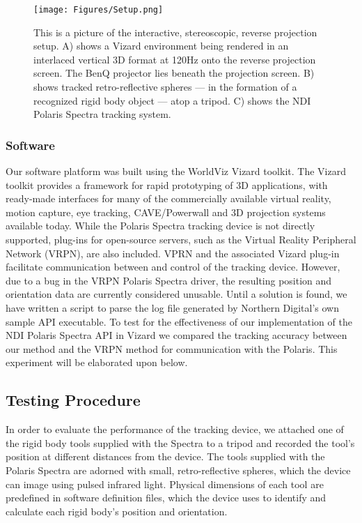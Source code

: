 \documentclass[]{spie}  %
\begin{document}
\begin{figure}[htb]
      \centering
      \texttt{[image: Figures/Setup.png]}
      \caption{This is a picture of the interactive, stereoscopic, reverse projection setup. A) shows a Vizard environment being rendered in an interlaced vertical 3D format at 120Hz onto the reverse projection screen. The BenQ projector lies beneath the projection screen. B) shows tracked retro-reflective spheres --- in the formation of a recognized rigid body object --- atop a tripod. C) shows the NDI Polaris Spectra tracking system.}
      \label{fig:Setup}
\end{figure}

\subsubsection{Software}
Our software platform was built using the WorldViz Vizard toolkit. The Vizard toolkit provides a framework for rapid prototyping of 3D applications, with ready-made interfaces for many of the commercially available virtual reality, motion capture, eye tracking, CAVE/Powerwall and 3D projection systems available today. While the Polaris Spectra tracking device is not directly supported, plug-ins for open-source servers, such as the Virtual Reality Peripheral Network (VRPN), are also included. VPRN and the associated Vizard plug-in facilitate communication between and control of the tracking device. However, due to a bug in the VRPN Polaris Spectra driver, the resulting position and orientation data are currently considered unusable. Until a solution is found, we have written a script to parse the log file generated by Northern Digital’s own sample API executable. To test for the effectiveness  of our implementation of the NDI Polaris Spectra API in Vizard we compared the tracking accuracy between our method and the VRPN method for communication with the Polaris. This experiment will be elaborated upon below.

\subsection{Testing Procedure}
In order to evaluate the performance of the tracking device, we attached one of the rigid body tools supplied with the Spectra to a tripod and recorded the tool’s position at different distances from the device. The tools supplied with the Polaris Spectra are adorned with small, retro-reflective spheres, which the device can image using pulsed infrared light. Physical dimensions of each tool are predefined in software definition files, which the device uses to identify and calculate each rigid body’s position and orientation.
\end{document}

